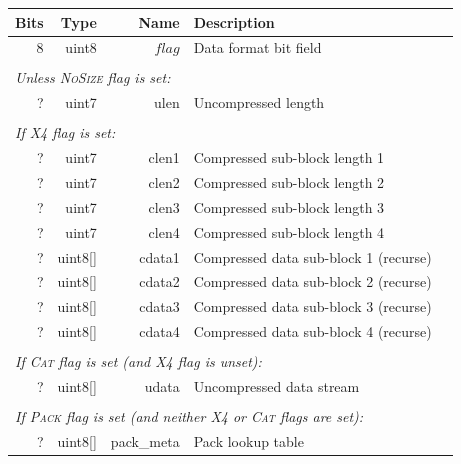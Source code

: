 \documentclass[a4paper]{article}
\begin{document}
\begin{table}[h]
\centering
\begin{tabular}{|r|r|r|r|p{9cm}|l|}
\hline
\multicolumn{2}{|r|}{\textbf{Bits} } & \textbf{Type}  & \textbf{Name} & \multicolumn{2}{p{9cm}|}{\textbf{Description}} \\
\hline
\multicolumn{2}{|r|}{8} & uint8 & $flag$ & \multicolumn{2}{p{9cm}|}{Data format bit field}\\
\cline{1-6}

\multicolumn{6}{|l|}{}\\[-0.3em]
\multicolumn{6}{|l|}{\textit{Unless \textsc{NoSize} flag is set:} } \\
\cline{2-5}
& ? & uint7 & ulen & Uncompressed length & \\
\cline{2-5}

\multicolumn{6}{|l|}{}\\[-0.3em]
\multicolumn{6}{|l|}{\textit{If \textsc{X4} flag is set:} } \\
\cline{2-5}
& ? & uint7 & clen1 & Compressed sub-block length 1 & \\
& ? & uint7 & clen2 & Compressed sub-block length 2 & \\
& ? & uint7 & clen3 & Compressed sub-block length 3 & \\
& ? & uint7 & clen4 & Compressed sub-block length 4 & \\
& ? & uint8[] & cdata1 & Compressed data sub-block 1 (recurse) & \\
& ? & uint8[] & cdata2 & Compressed data sub-block 2 (recurse) & \\
& ? & uint8[] & cdata3 & Compressed data sub-block 3 (recurse) & \\
& ? & uint8[] & cdata4 & Compressed data sub-block 4 (recurse) & \\
\cline{2-5}

\multicolumn{6}{|l|}{}\\[-0.7em]
\multicolumn{6}{|l|}{\textit{If \textsc{Cat} flag is set (and \textsc{X4} flag is unset):} } \\
\cline{2-5}
& ? & uint8[] & udata & Uncompressed data stream & \\
\cline{2-5}

\multicolumn{6}{|l|}{}\\[-0.7em]
\multicolumn{6}{|l|}{\textit{If \textsc{Pack} flag is set (and neither \textsc{X4} or \textsc{Cat} flags are set):} } \\
\cline{2-5}
& ? & uint8[] & pack\_meta & Pack lookup table & \\
\cline{2-5}


\end{tabular}
\end{table}
\end{document}
